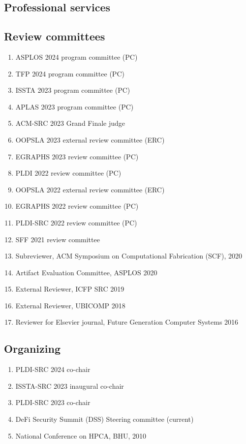 \documentclass[margin, 10pt]{res} %
\begin{document}
\begin{resume}
\section{Professional services}


\subsection{Review committees}

\begin{enumerate}[itemsep=-2pt]
\item ASPLOS 2024 program committee (PC)
\item TFP 2024 program committee (PC)
\item ISSTA 2023 program committee (PC)
\item APLAS 2023 program committee (PC)
\item ACM-SRC 2023 Grand Finale judge
\item OOPSLA 2023 external review committee (ERC)
\item EGRAPHS 2023 review committee (PC)
\item PLDI 2022 review committee (PC)
\item OOPSLA 2022 external review committee (ERC)
\item EGRAPHS 2022 review committee (PC)
\item PLDI-SRC 2022 review committee (PC)
\item SFF 2021 review committee
\item Subreviewer, ACM Symposium on Computational Fabrication (SCF), 2020
\item Artifact Evaluation Committee, ASPLOS 2020
\item External Reviewer, ICFP SRC 2019
\item External Reviewer, UBICOMP 2018
\item Reviewer for Elsevier journal, Future Generation Computer Systems 2016
\end{enumerate}

\subsection{Organizing}
\begin{enumerate}[itemsep=-2pt]
  \item PLDI-SRC 2024 co-chair
  \item ISSTA-SRC 2023 inaugural co-chair
  \item PLDI-SRC 2023 co-chair
  \item DeFi Security Summit (DSS) Steering committee (current)
  \item National Conference on HPCA, BHU, 2010
\end{enumerate}


\end{resume}
\end{document}

